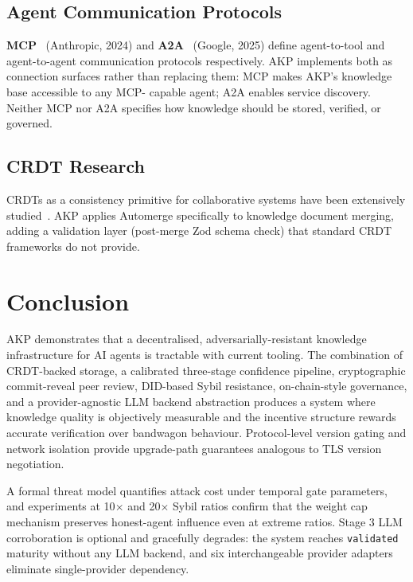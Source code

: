 \documentclass[10pt,twocolumn]{article}
\begin{document}
\subsection{Agent Communication Protocols}

\textbf{MCP}~\cite{mcp} (Anthropic, 2024) and \textbf{A2A}~\cite{a2a}
(Google, 2025) define agent-to-tool and agent-to-agent communication
protocols respectively. AKP implements both as connection surfaces rather
than replacing them: MCP makes AKP's knowledge base accessible to any MCP-
capable agent; A2A enables service discovery. Neither MCP nor A2A specifies
how knowledge should be stored, verified, or governed.

\subsection{CRDT Research}

CRDTs as a consistency primitive for collaborative systems have been
extensively studied~\cite{shapiro2011crdt,automerge}. AKP applies Automerge
specifically to knowledge document merging, adding a validation layer
(post-merge Zod schema check) that standard CRDT frameworks do not provide.

\section{Conclusion}

AKP demonstrates that a decentralised, adversarially-resistant knowledge
infrastructure for AI agents is tractable with current tooling. The combination
of CRDT-backed storage, a calibrated three-stage confidence pipeline,
cryptographic commit-reveal peer review, DID-based Sybil resistance,
on-chain-style governance, and a provider-agnostic LLM backend abstraction
produces a system where knowledge quality is objectively measurable and the
incentive structure rewards accurate verification over bandwagon behaviour.
Protocol-level version gating and network isolation provide upgrade-path
guarantees analogous to TLS version negotiation.

A formal threat model quantifies attack cost under temporal gate parameters,
and experiments at 10$\times$ and 20$\times$ Sybil ratios confirm that the
weight cap mechanism preserves honest-agent influence even at extreme ratios.
Stage 3 LLM corroboration is optional and gracefully degrades: the system
reaches \texttt{validated} maturity without any LLM backend, and six
interchangeable provider adapters eliminate single-provider dependency.
\end{document}
